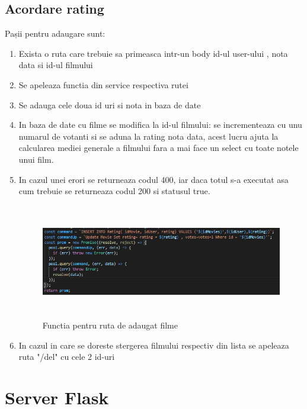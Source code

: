 \subsection{Acordare rating}
\par Pașii pentru adaugare sunt:
\begin{enumerate}
  	\item Exista o ruta care trebuie sa primeasca intr-un body id-ul user-ului , nota data si id-ul filmului
  	\item Se apeleaza functia din service respectiva rutei
	\item Se adauga cele doua id uri si nota in baza de date 
	\item In baza de date cu filme se modifica la id-ul filmului: se incrementeaza cu unu numarul de votanti si se aduna la rating nota data, acest lucru ajuta la calcularea mediei generale a filmului fara a mai face un select cu toate notele unui film.
  	\item In cazul unei erori se returneaza codul 400, iar daca totul s-a executat asa cum trebuie se returneaza codul 200 si statusul true.
		\begin{figure}[htbp]
			\centerline{\includegraphics[width=15cm, height=5cm]{figures/functie rating.png}}
			\caption{Functia pentru ruta de adaugat filme}
			\label{fig}
		\end{figure}	
	\item In cazul in care se doreste stergerea filmului respectiv din lista se apeleaza ruta "/del" cu cele 2 id-uri
\end{enumerate}

\section{Server Flask}
\label{sec:ch5sec1}

